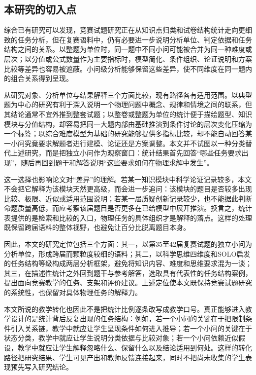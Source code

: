 \documentclass[
  12pt,
  a4paper]{ctexbook}
\begin{document}
\subsection{本研究的切入点}\label{ux672cux7814ux7a76ux7684ux5207ux5165ux70b9}

综合已有研究可以发现，竞赛试题研究正在从知识点归类和试卷结构统计走向更细致的任务分析，但在复赛语料中，仍有必要进一步说明分析单位、判定依据和任务结构之间的关系。以整题为单位时，同一题中不同小问可能被合并为同一种难度或层次；以分值或公式数量作为主要指标时，模型简化、条件组织、论证说明和方案比较等差异也容易被遮蔽。小问级分析能够保留这些差异，使不同维度在同一题内的组合关系得到呈现。

从研究对象、分析单位与结果解释三个方面比较，现有路径各有适用范围。以典型题为中心的研究有利于深入说明一个物理问题中概念、规律和情境之间的联系，但其结论通常不宜外推到整套试题；以整卷或整题为单位的统计便于描绘题型、知识模块与分值结构，却容易把同一大题内部由基础推演到条件讨论的层次变化压缩为一个标签；以综合难度模型为基础的研究能够提供多指标比较，却不能自动回答某一小问究竟要求解题者进行建模、论证还是方案调整。本文并不试图以一种分类替代上述研究，而是把独立小问作为观察窗口：统计结果首先回答``哪些任务要求出现''，随后再回到题干和解答说明``这些要求如何在物理求解中发生''。

这一选择也影响论文对``差异''的理解。若某一知识模块中科学论证记录较多，本文不会把它解释为该模块天然更高级，而会进一步追问：该模块的题目是否较多出现比较、极限、近似或适用范围说明；若某一届质疑创新记录较少，也不能据此判断命题质量高低，而应考察该届题目是否更多在已给模型中展开推演。换言之，统计表提供的是检索和比较的入口，物理任务的具体组织才是解释的落点。这样的处理既保留跨届语料的整体视野，也避免让百分比脱离题目本身。

因此，本文的研究定位包括三个方面：其一，以第35至42届复赛试题的独立小问为分析单位，形成跨届而颗粒度较细的语料；其二，以科学思维四维度和SOLO启发的任务结构等级构成两层分析框架，避免将知识内容、难度和思维要求混为一谈；其三，在描述性统计之外回到题干与参考解答，选取具有代表性的任务结构案例，提出面向竞赛教学的任务、支架和评价建议。上述定位使本文既保持竞赛试题研究的系统性，也保留对具体物理任务的解释力。

本文所说的教学转化也因此不是把统计比例逐条改写成教学口号。真正能够进入教学设计的是统计背后反复出现的任务结构：例如，若一个小问的关键在于把限制条件引入关系链，教学中就应让学生呈现条件如何进入推导；若一个小问的关键在于状态分类，教学中就应让学生说明分类依据与比较对象；若一个小问依赖近似假设，教学中就应让学生解释忽略什么、保留什么以及结论适用到何处。这样的转化路径把研究结果、学生可见产出和教师反馈连接起来，同时不把尚未收集的学生表现预先写入研究结论。
\end{document}
